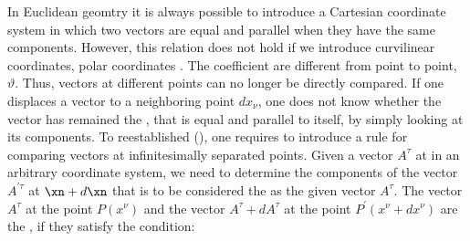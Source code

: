 {%
%
%
%


In Euclidean geomtry it is always possible to introduce a Cartesian coordinate system in which two vectors are equal and parallel when they have the same components. However, this relation does not hold if we introduce curvilinear coordinates, \eg polar coordinates \citep[028-01-03, 35]{HR}. The coefficient are different from point to point, $\vartheta$. Thus, vectors at different points can no longer be directly compared. If one displaces a vector to a neighboring point $dx_\nu$, one does not know whether the vector has remained the , that is equal and parallel to itself, by simply looking at its components. To reestablished  (), one requires to introduce a rule for comparing vectors at infinitesimally separated points. Given a vector $A^\tau$ at \xn in an arbitrary coordinate system, we need to determine the components of the vector $A^{\prime\tau}$ at $\xn+d\xn$ that is to be considered the  as the given vector $A^\tau$. The vector $A^{\tau}$ at the point $P\left(x^{\nu}\right)$ and the vector $A^{\tau}+d A^{\tau}$ at the point $P^{\prime}\left(x^{\nu}+d x^{\nu}\right)$ are the , if they satisfy the condition:

}
